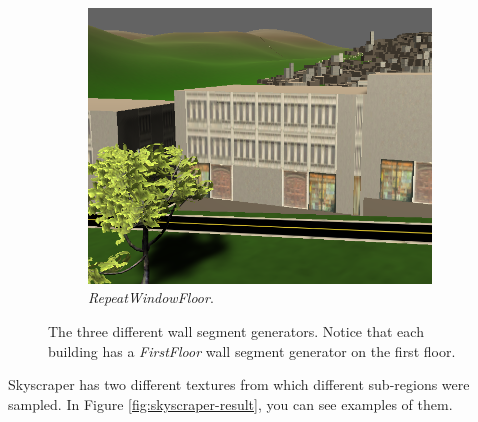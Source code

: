 \begin{figure}[H]
  \quad
  \begin{subfigure}[b]{0.25\textwidth}
      \includegraphics[width=\textwidth]{figure/building-only-window.PNG}
      \caption{\textit{RepeatWindowFloor}.}
  \end{subfigure}
  
  \caption{The three different wall segment generators. Notice that each building has a \textit{FirstFloor} wall segment generator on the first floor.}
  \label{fig:wall-segment-generator}
\end{figure}

Skyscraper has two different textures from which different sub-regions were sampled. In Figure \ref{fig:skyscraper-result}, you can see examples of them. 


